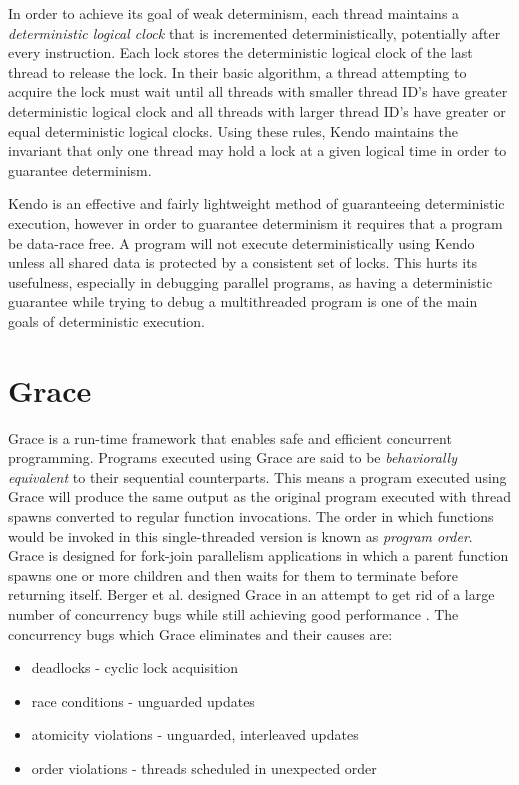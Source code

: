 In order to achieve its goal of weak determinism, each thread
maintains a \emph{deterministic logical clock} that is incremented
deterministically, potentially after every instruction.  Each lock
stores the deterministic logical clock of the last thread to release
the lock.  In their basic algorithm, a thread attempting to acquire
the lock must wait until all threads with smaller thread ID's have
greater deterministic logical clock and all threads with larger thread
ID's have greater or equal deterministic logical clocks.  Using these
rules, Kendo maintains the invariant that only one thread may hold a
lock at a given logical time in order to guarantee determinism.

Kendo is an effective and fairly lightweight method of guaranteeing
deterministic execution, however in order to guarantee determinism it
requires that a program be data-race free.  A program will not execute
deterministically using Kendo unless all shared data is protected by a
consistent set of locks.  This hurts its usefulness, especially in
debugging parallel programs, as having a deterministic guarantee while
trying to debug a multithreaded program is one of the main goals of
deterministic execution.

\section{Grace}

Grace is a run-time framework that enables safe and efficient
concurrent programming.  Programs executed using Grace are said to be
\emph{behaviorally equivalent} to their sequential counterparts.  This
means a program executed using Grace will produce the same output as
the original program executed with thread spawns converted to regular
function invocations.  The order in which functions would be invoked
in this single-threaded version is known as \emph{program order}.
Grace is designed for fork-join parallelism applications in which a
parent function spawns one or more children and then waits for them to
terminate before returning itself.  Berger et al. designed Grace in an
attempt to get rid of a large number of concurrency bugs while still
achieving good performance \cite{grace}.  The concurrency bugs which
Grace eliminates and their causes are:

\begin{itemize}
\item deadlocks - cyclic lock acquisition

\item race conditions - unguarded updates

\item atomicity violations - unguarded, interleaved updates

\item order violations - threads scheduled in unexpected order
\end{itemize}

